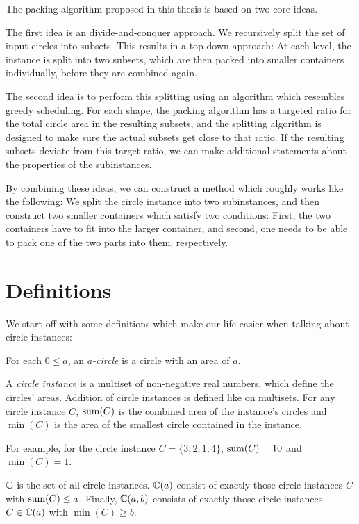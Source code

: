 \documentclass[a4paper,style=print,bibliography=totoc,nexus,lnum,extramargin]{tubsbook}
\begin{document}
The packing algorithm proposed in this thesis is based on two core ideas.

The first idea is an divide-and-conquer approach. We recursively split the set of input circles into subsets. This results in a top-down approach: At each level, the instance is split into two subsets, which are then packed into smaller containers individually, before they are combined again.

The second idea is to perform this splitting using an algorithm which resembles greedy scheduling. For each shape, the packing algorithm has a targeted ratio for the total circle area in the resulting subsets, and the splitting algorithm is designed to make sure the actual subsets get close to that ratio. If the resulting subsets deviate from this target ratio, we can make additional statements about the properties of the subinstances.

By combining these ideas, we can construct a method which roughly works like the following: We split the circle instance into two subinstances, and then construct two smaller containers which satisfy two conditions: First, the two containers have to fit into the larger container, and second, one needs to be able to pack one of the two parts into them, respectively.

\section{Definitions}

We start off with some definitions which make our life easier when talking about circle instances:

\begin{definition}
    For each $0 \le a$, an \emph{$a$-circle} is a circle with an area of $a$.
\end{definition}

\begin{definition}
    A \emph{circle instance} is a multiset of non-negative real numbers, which define the circles' areas. Addition of circle instances is defined like on multisets.
    For any circle instance $C$, $\operatorname{sum}(C)$ is the combined area of the instance's circles and $\min(C)$ is the area of the smallest circle contained in the instance.
\end{definition}

For example, for the circle instance $C = \{3,2,1,4\}$, $\operatorname{sum}(C) = 10$ and $\min(C) = 1$.

\begin{definition}
    $\mathbb{C}$ is the set of all circle instances. $\mathbb{C}(a)$ consist of exactly those circle instances $C$ with $\operatorname{sum}(C) \le a$. Finally, $\mathbb{C}(a,b)$ consists of exactly those circle instances $C \in \mathbb{C}(a)$ with $\min(C) \ge b$.
\end{definition}
\end{document}
